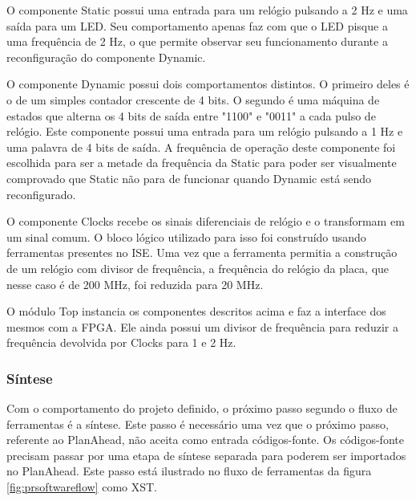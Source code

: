 \documentclass[11pt,a4paper,oneside]{book}
\begin{document}
O componente \dlq{}Static\drq{} possui uma entrada para um relógio pulsando a 2 Hz e uma saída para um LED.
Seu comportamento apenas faz com que o LED pisque a uma frequência de 2 Hz, o que permite observar seu funcionamento durante a reconfiguração do componente \dlq{}Dynamic\drq{}.

O componente \dlq{}Dynamic\drq{} possui dois comportamentos distintos.
O primeiro deles é o de um simples contador crescente de 4 bits.
O segundo é uma máquina de estados que alterna os 4 bits de saída entre "1100" e "0011" a cada pulso de relógio.
Este componente possui uma entrada para um relógio pulsando a 1 Hz e uma palavra de 4 bits de saída.
A frequência de operação deste componente foi escolhida para ser a metade da frequência da \dlq{}Static\drq{} para poder ser visualmente comprovado que \dlq{}Static\drq{} não para de funcionar quando \dlq{}Dynamic\drq{} está sendo reconfigurado.

O componente \dlq{}Clocks\drq{} recebe os sinais diferenciais de relógio e o transformam em um sinal comum.
O bloco lógico utilizado para isso foi construído usando ferramentas presentes no ISE.
Uma vez que a ferramenta permitia a construção de um relógio com divisor de frequência, a frequência do relógio da placa, que nesse caso é de 200 MHz, foi reduzida para 20 MHz.

O módulo \dlq{}Top\drq{} instancia os componentes descritos acima e faz a interface dos mesmos com a FPGA.
Ele ainda possui um divisor de frequência para reduzir a frequência devolvida por \dlq{}Clocks\drq{} para 1 e 2 Hz.


\subsubsection{Síntese}
Com o comportamento do projeto definido, o próximo passo segundo o fluxo de ferramentas é a síntese.
Este passo é necessário uma vez que o próximo passo, referente ao PlanAhead, não aceita como entrada códigos-fonte.
Os códigos-fonte precisam passar por uma etapa de síntese separada para poderem ser importados no PlanAhead.
Este passo está ilustrado no fluxo de ferramentas da figura \ref{fig:prsoftwareflow} como XST.
\end{document}
